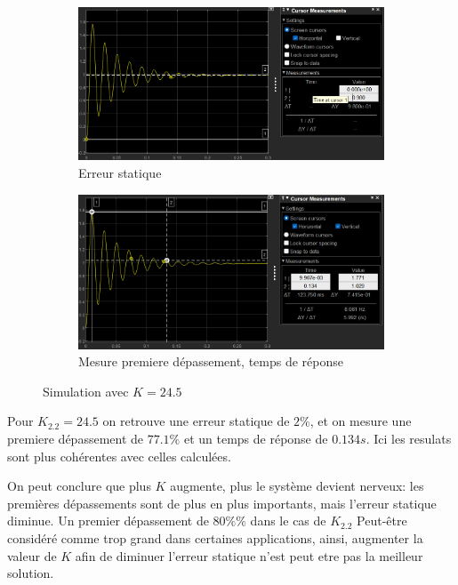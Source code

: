 \documentclass[12pt, a4paper]{report}
\begin{document}
\begin{figure}[H]
    \begin{subfigure}[h!]{0.4\linewidth}
        \includegraphics[width=\linewidth]{sim2kpourerreur2prcerreur.png}
        \caption{Erreur statique}
    \end{subfigure}
    \hfill    
    \begin{subfigure}[h!]{0.4\linewidth}
        \includegraphics[width=\linewidth]{sim2kpourerreur2prcdeptr.png}
        \caption{Mesure premiere dépassement, temps de réponse}
    \end{subfigure}
    \caption{Simulation avec $K = 24.5$}
    \label{fig:sim2Kpour10prc}
\end{figure}

Pour $K_{2.2} = 24.5$ on retrouve une erreur statique de $2\%$, et on mesure une premiere dépassement de $77.1\%$ et un temps de réponse de 
$0.134s$. Ici les resulats sont plus cohérentes avec celles calculées.

On peut conclure que plus $K$ augmente, plus le système devient nerveux: les premières dépassements sont de plus en plus importants, mais l'erreur statique diminue.
Un premier dépassement de $80 \%\%$ dans le cas de $K_{2.2}$ Peut-être considéré comme trop grand dans certaines applications, ainsi, augmenter la valeur de $K$ afin de 
diminuer l'erreur statique n'est peut etre pas la meilleur solution.
\end{document}
